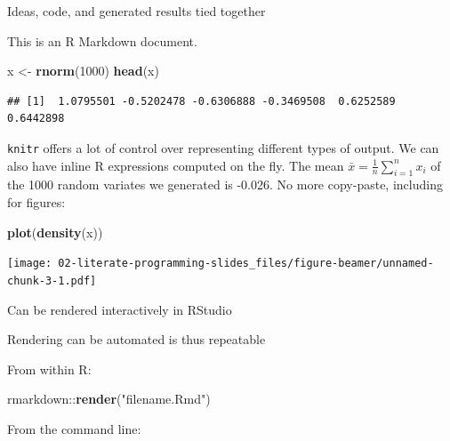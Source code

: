 \documentclass[ignorenonframetext,]{beamer}
\newenvironment{Shaded}{}{}
\newcommand{\DecValTok}[1]{\textcolor[rgb]{0.25,0.63,0.44}{#1}}
\newcommand{\ExtensionTok}[1]{#1}
\newcommand{\KeywordTok}[1]{\textcolor[rgb]{0.00,0.44,0.13}{\textbf{#1}}}
\newcommand{\NormalTok}[1]{#1}
\newcommand{\OperatorTok}[1]{\textcolor[rgb]{0.40,0.40,0.40}{#1}}
\newcommand{\StringTok}[1]{\textcolor[rgb]{0.25,0.44,0.63}{#1}}
\begin{document}
\begin{frame}[fragile]{%
\protect\hypertarget{ideas-code-and-generated-results-tied-together}{%
Ideas, code, and generated results tied together}}

This is an R Markdown document.

\begin{Shaded}
\begin{Highlighting}[]
\NormalTok{x <-}\StringTok{ }\KeywordTok{rnorm}\NormalTok{(}\DecValTok{1000}\NormalTok{)}
\KeywordTok{head}\NormalTok{(x)}
\end{Highlighting}
\end{Shaded}

\begin{verbatim}
## [1]  1.0795501 -0.5202478 -0.6306888 -0.3469508  0.6252589  0.6442898
\end{verbatim}

\texttt{knitr} offers a lot of control over representing different types
of output. We can also have inline R expressions computed on the fly.
The mean \(\bar{x} = \frac{1}{n} \sum_{i=1}^{n} x_{i}\) of the 1000
random variates we generated is -0.026. No more copy-paste, including
for figures:

\begin{Shaded}
\begin{Highlighting}[]
\KeywordTok{plot}\NormalTok{(}\KeywordTok{density}\NormalTok{(x))}
\end{Highlighting}
\end{Shaded}

\texttt{[image: 02-literate-programming-slides\_files/figure-beamer/unnamed-chunk-3-1.pdf]}

\end{frame}

\begin{frame}{%
\protect\hypertarget{can-be-rendered-interactively-in-rstudio}{%
Can be rendered interactively in RStudio}}

\end{frame}

\begin{frame}[fragile]{%
\protect\hypertarget{rendering-can-be-automated-is-thus-repeatable}{%
Rendering can be automated is thus repeatable}}

From within R:

\begin{Shaded}
\begin{Highlighting}[]
\NormalTok{rmarkdown}\OperatorTok{::}\KeywordTok{render}\NormalTok{(}\StringTok{"filename.Rmd"}\NormalTok{)}
\end{Highlighting}
\end{Shaded}

From the command line:

\begin{Shaded}
\end{Shaded}

\end{frame}
\end{document}
